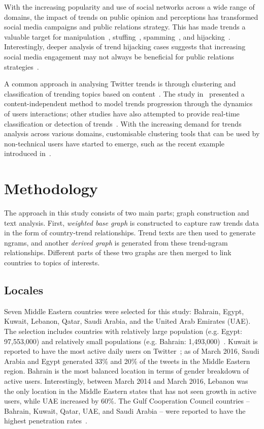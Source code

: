 \documentclass[conference]{IEEEtran}
\begin{document}
With the increasing popularity and use of social networks across a
wide range of domains, the impact of trends on public opinion and
perceptions has transformed social media campaigns and public
relations strategy. This has made trends a valuable target for
manipulation~\cite{Zhang2017}, stuffing~\cite{Irani2010},
spamming~\cite{Sedhai2015,Chu2012}, and
hijacking~\cite{VanDam2016}. Interestingly, deeper analysis of trend
hijacking cases suggests that increasing social media engagement may
not always be beneficial for public relations
strategies~\cite{Sanderson2016,albishry-et-al:ssei2018}.

A common approach in analysing Twitter trends is through clustering
and classification of trending topics based on
content~\cite{Zubiaga2011,Benhardus2013,Ferragina2015,albishry-et-al:iccci2017}.
The study in~\cite{TenThij2016} presented a content-independent method
to model trends progression through the dynamics of users
interactions; other studies have also attempted to provide real-time
classification or detection of
trends~\cite{Mathioudakis2010,Zubiaga2015}. With the increasing demand
for trends analysis across various domains, customisable clustering
tools that can be used by non-technical users have started to emerge,
such as the recent example introduced in~\cite{Arn2018}.

\section{Methodology}\label{method}

The approach in this study consists of two main parts; graph construction
and text analysis. First, {\emph{weighted base graph}} is constructed to 
capture raw trends data in the form of country-trend relationships. Trend 
texts are then used to generate ngrams, and another {\emph{derived graph}}
is generated from these trend-ngram relationships. Different parts of these 
two graphs are then merged to link countries to topics of interests.

\subsection{Locales}

Seven Middle Eastern countries were selected for this study: Bahrain,
Egypt, Kuwait, Lebanon, Qatar, Saudi Arabia, and the United Arab
Emirates (UAE). The selection includes countries with relatively large
population (e.g. Egypt: 97,553,000) and relatively small populations
(e.g. Bahrain:
1,493,000)~\cite{UnitedNationsDepartmentofEconomicandSocialAffairs2017}.
Kuwait is reported to have the most active daily users on
Twitter~\cite{Salem2017}; as of March 2016, Saudi Arabia and Egypt
generated 33\% and 20\% of the tweets in the Middle Eastern
region. Bahrain is the most balanced location in terms of gender
breakdown of active users. Interestingly, between March 2014 and March
2016, Lebanon was the only location in the Middle Eastern states that
has not seen growth in active users, while UAE increased by 60\%. The
Gulf Cooperation Council countries -- Bahrain, Kuwait, Qatar, UAE, and
Saudi Arabia -- were reported to have the highest penetration
rates~\cite{Salem2017}.
\end{document}
